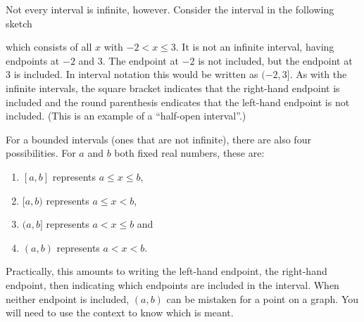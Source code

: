 \documentclass[noauthor, nooutcomes]{ximera}
\begin{document}
	Not every interval is infinite, however. Consider the interval in the following sketch
	\begin{image}
	\end{image}
	which consists of all $x$ with $-2 < x \leq 3$. It is not an infinite interval, having endpoints at $-2$ and $3$. The endpoint at $-2$ is not included, but the endpoint at $3$ is included. In interval notation this would be written as $(-2, 3]$. As with the infinite intervals,
	the square bracket indicates that the right-hand endpoint is included and the round parenthesis endicates that the left-hand endpoint is not included. (This is an example of a ``half-open interval''.)

	For a bounded intervals (ones that are not infinite), there are also four possibilities. For $a$ and $b$ both fixed real numbers, these are:
	\begin{enumerate}
		\item $[a, b]$ represents $a \leq x \leq b$,
		\item $[a, b)$ represents $a \leq x < b$,
		\item $(a, b]$ represents $a < x \leq b$ and
		\item $(a, b)$ represents $a < x < b$.
	\end{enumerate}
	Practically, this amounts to writing the left-hand endpoint, the right-hand endpoint, then indicating which endpoints are included in the interval. When neither endpoint is included, $(a,b)$ can be mistaken for a point on a graph. You will need to use the context
	to know which is meant.
\end{document}
